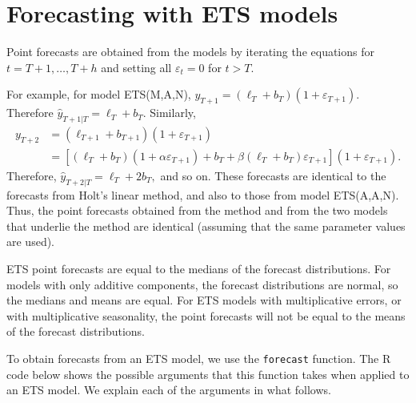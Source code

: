 \documentclass[]{book}
\newenvironment{Shaded}{\begin{snugshade}}{\end{snugshade}}
\newcommand{\DataTypeTok}[1]{\textcolor[rgb]{0.13,0.29,0.53}{#1}}
\newcommand{\DecValTok}[1]{\textcolor[rgb]{0.00,0.00,0.81}{#1}}
\newcommand{\KeywordTok}[1]{\textcolor[rgb]{0.13,0.29,0.53}{\textbf{#1}}}
\newcommand{\NormalTok}[1]{#1}
\newcommand{\OperatorTok}[1]{\textcolor[rgb]{0.81,0.36,0.00}{\textbf{#1}}}
\newcommand{\OtherTok}[1]{\textcolor[rgb]{0.56,0.35,0.01}{#1}}
\begin{document}
\hypertarget{forecasting-with-ets-models}{%
\section{Forecasting with ETS models}\label{forecasting-with-ets-models}}

Point forecasts are obtained from the models by iterating the equations for \(t=T+1,\dots,T+h\) and setting all \(\varepsilon_t=0\) for \(t>T\).

For example, for model ETS(M,A,N), \(y_{T+1} = (\ell_T + b_T )(1+ \varepsilon_{T+1}).\) Therefore \(\hat{y}_{T+1|T}=\ell_{T}+b_{T}.\) Similarly,
\begin{align*}
y_{T+2} &= (\ell_{T+1} + b_{T+1})(1 + \varepsilon_{T+1})\\
        &= \left[
              (\ell_T + b_T) (1+ \alpha\varepsilon_{T+1}) +
              b_T + \beta (\ell_T + b_T)\varepsilon_{T+1}
            \right]
   ( 1 + \varepsilon_{T+1}).
\end{align*}
Therefore, \(\hat{y}_{T+2|T}= \ell_{T}+2b_{T},\) and so on. These forecasts are identical to the forecasts from Holt's linear method, and also to those from model ETS(A,A,N). Thus, the point forecasts obtained from the method and from the two models that underlie the method are identical (assuming that the same parameter values are used).

ETS point forecasts are equal to the medians of the forecast distributions. For models with only additive components, the forecast distributions are normal, so the medians and means are equal. For ETS models with multiplicative errors, or with multiplicative seasonality, the point forecasts will not be equal to the means of the forecast distributions.

To obtain forecasts from an ETS model, we use the \texttt{forecast} function. The R code below shows the possible arguments that this function takes when applied to an ETS model. We explain each of the arguments in what follows.

\begin{Shaded}
\end{Shaded}
\end{document}
